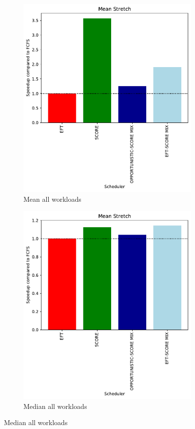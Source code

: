 \documentclass[a4paper]{article}
\begin{document}
\begin{figure}[H]\centering
\begin{subfigure}[b]{0.4\linewidth}\centering\includegraphics[width=1\linewidth]{MBSS/plot/Results_Percentage_FCFS_All_workloads_mean_Mean_Stretch_450_128_32_256_4_1024.pdf}\caption{Mean all workloads}\end{subfigure}
\begin{subfigure}[b]{0.4\linewidth}\centering\includegraphics[width=1\linewidth]{MBSS/plot/Results_Percentage_FCFS_All_workloads_mediane_Mean_Stretch_450_128_32_256_4_1024.pdf}\caption{Median all workloads}\end{subfigure}

\end{figure}
\end{document}
